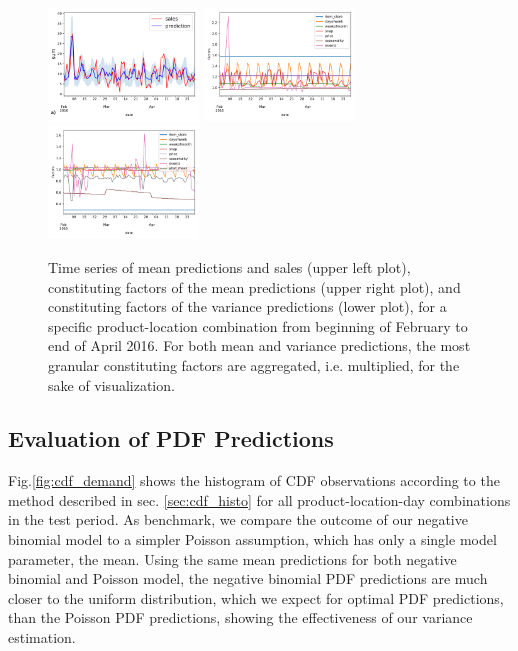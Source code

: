 \documentclass[BCOR=1mm, DIV=calc,10pt,
twoside=true,
twocolumn,
headings=normal]{scrartcl}
\newcommand{\fig}{Fig.}
\begin{document}
\begin{figure}
\begin{center}
\includegraphics[width=4cm]{../figures/ts_item_16_store_6}
\includegraphics[width=4cm]{../figures/factors_ts}
\includegraphics[width=4cm]{../figures/factors_ts_width}
\caption{\label{fig:factor_plots} Time series of mean predictions and sales (upper left plot), constituting factors of the mean predictions (upper right plot), and constituting factors of the variance predictions (lower plot), for a specific product-location combination from beginning of February to end of April 2016. For both mean and variance predictions, the most granular constituting factors are aggregated, i.e. multiplied, for the sake of visualization.}
\end{center}
\end{figure}

\subsection{Evaluation of PDF Predictions}

\fig \ref{fig:cdf_demand} shows the histogram of CDF observations according to the method described in sec. \ref{sec:cdf_histo} for all product-location-day combinations in the test period. As benchmark, we compare the outcome of our negative binomial model to a simpler Poisson assumption, which has only a single model parameter, the mean. Using the same mean predictions for both negative binomial and Poisson model, the negative binomial PDF predictions are much closer to the uniform distribution, which we expect for optimal PDF predictions, than the Poisson PDF predictions, showing the effectiveness of our variance estimation.
\end{document}
